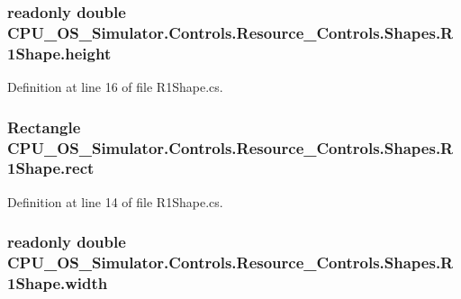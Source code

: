 \subsubsection[{height}]{\setlength{\rightskip}{0pt plus 5cm}readonly double C\+P\+U\+\_\+\+O\+S\+\_\+\+Simulator.\+Controls.\+Resource\+\_\+\+Controls.\+Shapes.\+R1\+Shape.\+height\hspace{0.3cm}{\ttfamily [private]}}\label{class_c_p_u___o_s___simulator_1_1_controls_1_1_resource___controls_1_1_shapes_1_1_r1_shape_a748f21a84a6c5c28e4e843fd4c1a4012}


Definition at line 16 of file R1\+Shape.\+cs.

\hypertarget{class_c_p_u___o_s___simulator_1_1_controls_1_1_resource___controls_1_1_shapes_1_1_r1_shape_af06b283d1c4acd26e66897b454349363}{}
\subsubsection[{rect}]{\setlength{\rightskip}{0pt plus 5cm}Rectangle C\+P\+U\+\_\+\+O\+S\+\_\+\+Simulator.\+Controls.\+Resource\+\_\+\+Controls.\+Shapes.\+R1\+Shape.\+rect\hspace{0.3cm}{\ttfamily [private]}}\label{class_c_p_u___o_s___simulator_1_1_controls_1_1_resource___controls_1_1_shapes_1_1_r1_shape_af06b283d1c4acd26e66897b454349363}


Definition at line 14 of file R1\+Shape.\+cs.

\hypertarget{class_c_p_u___o_s___simulator_1_1_controls_1_1_resource___controls_1_1_shapes_1_1_r1_shape_a8ce2dd23065f10c9f4fe1b642887e7bc}{}
\subsubsection[{width}]{\setlength{\rightskip}{0pt plus 5cm}readonly double C\+P\+U\+\_\+\+O\+S\+\_\+\+Simulator.\+Controls.\+Resource\+\_\+\+Controls.\+Shapes.\+R1\+Shape.\+width\hspace{0.3cm}{\ttfamily [private]}}\label{class_c_p_u___o_s___simulator_1_1_controls_1_1_resource___controls_1_1_shapes_1_1_r1_shape_a8ce2dd23065f10c9f4fe1b642887e7bc}


